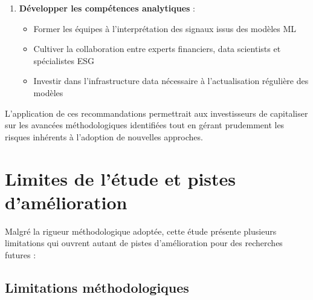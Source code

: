 \begin{enumerate}
  \item \textbf{Développer les compétences analytiques} :
  \begin{itemize}
    \item Former les équipes à l'interprétation des signaux issus des modèles ML
    \item Cultiver la collaboration entre experts financiers, data scientists et spécialistes ESG
    \item Investir dans l'infrastructure data nécessaire à l'actualisation régulière des modèles
  \end{itemize}
\end{enumerate}

L'application de ces recommandations permettrait aux investisseurs de capitaliser sur les avancées méthodologiques identifiées tout en gérant prudemment les risques inhérents à l'adoption de nouvelles approches.

\section*{Limites de l'étude et pistes d'amélioration}

Malgré la rigueur méthodologique adoptée, cette étude présente plusieurs limitations qui ouvrent autant de pistes d'amélioration pour des recherches futures :

\subsection*{Limitations méthodologiques}


